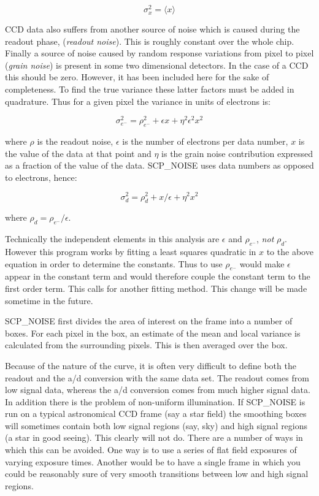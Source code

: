 \begin{displaymath}
\sigma^2_x = \langle x\rangle
\end{displaymath}

CCD data also suffers from another source of noise which is caused during the
readout phase, ({\it readout noise}).  This is roughly constant over the whole
chip.  Finally a source of noise caused by random response variations from
pixel to pixel ({\it grain noise}) is present in some two dimensional
detectors.  In the case of a CCD this should be zero.  However, it has been
included here for the sake of completeness.  To find the true variance these
latter factors must be added in quadrature.  Thus for a given pixel the
variance in units of electrons is:

\begin{displaymath}
\sigma^2_{e^-} = \rho^2_{e^-} + \epsilon x + \eta^2 \epsilon^2 x^2
\end{displaymath}

where $\rho$ is the readout noise, $\epsilon$ is the number of electrons
per data number, $x$ is the value of the data at that point and
$\eta$ is the grain noise contribution expressed as a fraction of the
value of the data.  SCP\_NOISE uses data numbers as opposed to electrons,
hence:

\begin{displaymath}
\sigma^2_d = \rho^2_d + x/\epsilon + \eta^2 x^2
\end{displaymath}

where $\rho_d = \rho_{e^-}/\epsilon$.

Technically the independent elements in this analysis are $\epsilon$ and
$\rho_{e^-}$, {\it not} $\rho_d$.  However this program works by fitting a
least squares quadratic in $x$ to the above equation in order to determine the
constants. Thus to use $\rho_{e^-}$ would make $\epsilon$ appear in the
constant term and would therefore couple the constant term to the first order
term.  This calls for another fitting method.  This change will be made
sometime in the future.

SCP\_NOISE first divides the area of interest on the frame into a number of
boxes.  For each pixel in the box, an estimate of the mean and local  variance
is calculated from the surrounding pixels.  This is then averaged over the box.

Because of the nature of the curve, it is often very difficult to define both
the readout and the a/d conversion with the same data set.  The readout comes
from low signal data, whereas the a/d conversion comes from much higher signal
data.  In addition there is the problem of non-uniform illumination.  If
SCP\_NOISE is run on a typical astronomical CCD frame (say a star field) the
smoothing boxes will sometimes contain both low signal regions (say, sky) and
high signal regions (a star in good seeing).  This clearly will not do.  There
are a number of ways in which this can be avoided.  One way is to use a series
of flat field exposures of varying exposure times.  Another would be to have a
single frame in which you could be reasonably sure of very smooth transitions
between low and high signal regions.

